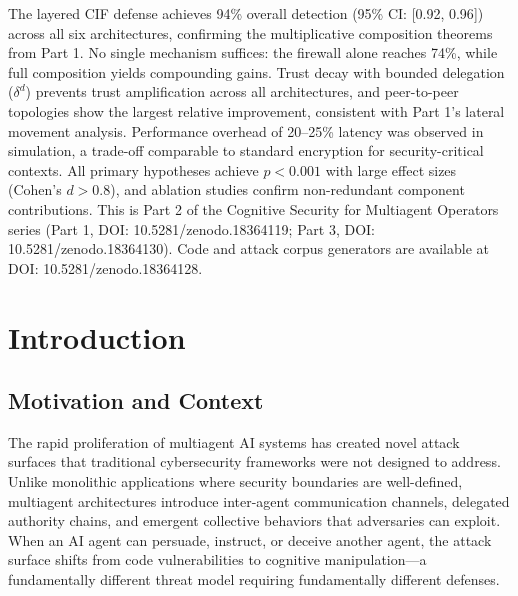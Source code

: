\documentclass[
]{article}
\begin{document}
The layered CIF defense achieves 94\% overall detection (95\% CI:
{[}0.92, 0.96{]}) across all six architectures, confirming the
multiplicative composition theorems from Part 1. No single mechanism
suffices: the firewall alone reaches 74\%, while full composition yields
compounding gains. Trust decay with bounded delegation (\(\delta^d\))
prevents trust amplification across all architectures, and peer-to-peer
topologies show the largest relative improvement, consistent with Part
1's lateral movement analysis. Performance overhead of 20--25\% latency
was observed in simulation, a trade-off comparable to standard
encryption for security-critical contexts. All primary hypotheses
achieve \(p < 0.001\) with large effect sizes (Cohen's \(d > 0.8\)), and
ablation studies confirm non-redundant component contributions. This is
Part 2 of the Cognitive Security for Multiagent Operators series (Part
1, DOI: 10.5281/zenodo.18364119; Part 3, DOI: 10.5281/zenodo.18364130).
Code and attack corpus generators are available at DOI:
10.5281/zenodo.18364128.

\newpage

\newpage

\section{Introduction}\label{sec:intro}

\subsection{Motivation and Context}\label{motivation-and-context}

The rapid proliferation of multiagent AI systems has created novel
attack surfaces that traditional cybersecurity frameworks were not
designed to address. Unlike monolithic applications where security
boundaries are well-defined, multiagent architectures introduce
inter-agent communication channels, delegated authority chains, and
emergent collective behaviors that adversaries can exploit. When an AI
agent can persuade, instruct, or deceive another agent, the attack
surface shifts from code vulnerabilities to cognitive manipulation---a
fundamentally different threat model requiring fundamentally different
defenses.
\end{document}
